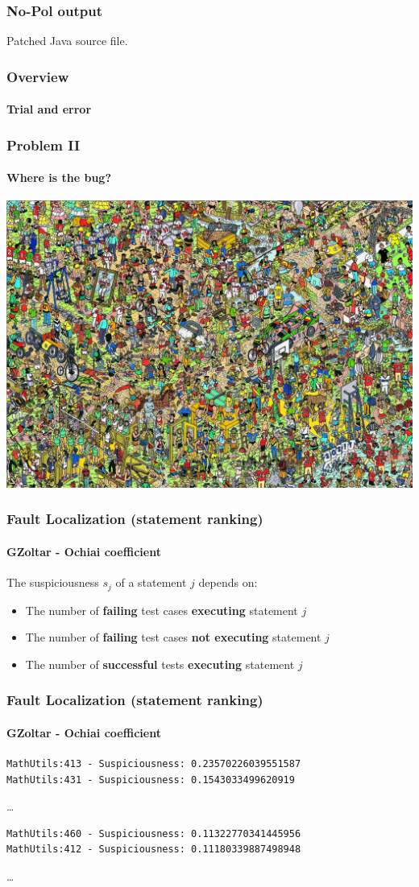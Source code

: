\documentclass[onlymath]{beamer}
\begin{document}
\begin{frame}
\frametitle{No-Pol output}
Patched Java source file.
\end{frame}


\frame
{
    \frametitle{Overview}
    \framesubtitle{Trial and error}
  \begin{center}
  
  \end{center}
}

\begin{frame}
\frametitle{Problem II}
\framesubtitle{Where is the bug?}
  \begin{center}
  \includegraphics[width=.8\paperwidth]{WheresWally}
  \end{center}
\end{frame}

\begin{frame}[fragile]
    \frametitle{Fault Localization (statement ranking)}
      \framesubtitle{GZoltar - Ochiai coefficient}
The suspiciousness $s_j$ of a statement $j$ depends on:
\begin{itemize}
 \item The number of \textbf{failing} test cases \textbf{executing} statement $j$ 
 \item The number of \textbf{failing} test cases \textbf{not executing} statement $j$
 \item The number of \textbf{successful} tests \textbf{executing} statement $j$
\end{itemize}
\end{frame}


\begin{frame}[fragile]
\frametitle{Fault Localization (statement ranking)}
\framesubtitle{GZoltar - Ochiai coefficient}
\begin{verbatim}
MathUtils:413 - Suspiciousness: 0.23570226039551587
MathUtils:431 - Suspiciousness: 0.1543033499620919
\end{verbatim}
\dots
\begin{verbatim}
MathUtils:460 - Suspiciousness: 0.11322770341445956
MathUtils:412 - Suspiciousness: 0.11180339887498948
\end{verbatim}
\dots
\end{frame}
\end{document}
